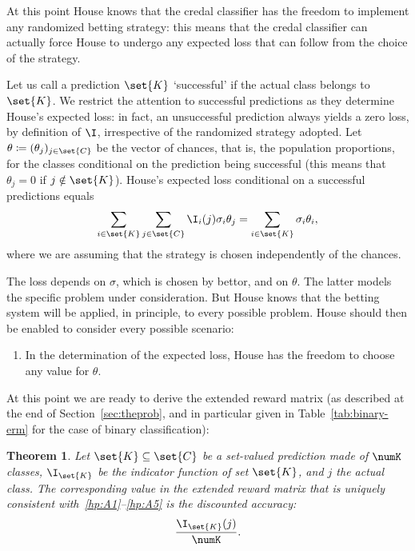 \documentclass[a4paper,10pt,reqno]{amsart}
\newtheorem{theorem}{Theorem}
\theoremstyle{remark}
\begin{document}
At this point House knows that the credal classifier has the freedom to implement any randomized betting strategy: this means that the credal classifier can actually force House to undergo any expected loss that can follow from the choice of the strategy.

Let us call a prediction $\set{K}$ `successful' if the actual class belongs to $\set{K}$. We restrict the attention to successful predictions as they determine House's expected loss: in fact, an unsuccessful prediction always yields a zero loss, by definition of $\I$, irrespective of the randomized strategy adopted. Let $\theta\coloneqq(\theta_j)_{j\in\set{C}}$ be the vector of chances, that is, the population proportions, for the classes conditional on the prediction being successful (this means that $\theta_j=0$ if $j\notin\set{K}$). House's expected loss conditional on a successful predictions equals $$\sum_{i\in\set{K}}\sum_{j\in\set{C}}\I_i(j)\sigma_i\theta_j=\sum_{i\in\set{K}}\sigma_i\theta_i,$$ where we are assuming that the strategy is chosen independently of the chances.

The loss depends on $\sigma$, which is chosen by bettor, and on $\theta$. The latter models the specific problem under consideration. But House knows that the betting system will be applied, in principle, to every possible problem. House should then be enabled to consider every possible scenario: 
\begin{enumerate}[font=\normalfont,label=(A5)]
\item\label{hp:A5} In the determination of the expected loss, House has the freedom to choose any value for $\theta$.
\end{enumerate}
At this point we are ready to derive the extended reward matrix (as described at the end of Section~\ref{sec:theprob}, and in particular given in Table~\ref{tab:binary-erm} for the case of binary classification):
\begin{theorem}\label{thm:1} Let $\set{K}\subseteq\set{C}$ be a set-valued prediction made of $\numK$ classes, $\I_{\set{K}}$ be the indicator function of set $\set{K}$, and $j$ the actual class. The corresponding value in the extended reward matrix that is uniquely consistent with~\ref{hp:A1}--\ref{hp:A5} is the discounted accuracy:
\begin{equation}
\frac{\I_{\set{K}}(j)}{\numK}.
\end{equation}
\end{theorem}
\end{document}
